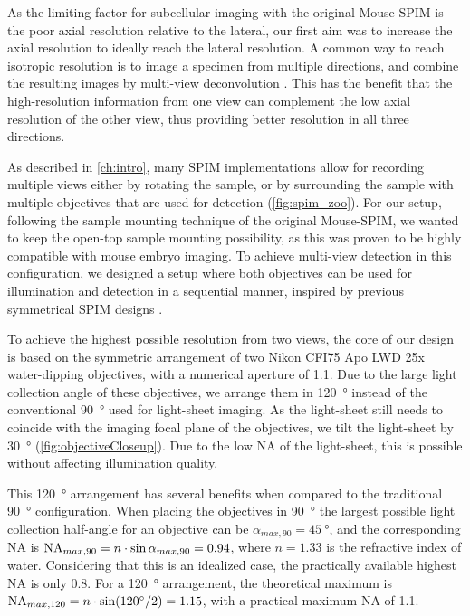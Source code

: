   As the limiting factor for subcellular imaging with the original Mouse-SPIM is the poor axial resolution relative to the lateral, our first aim was to increase the axial resolution to ideally reach the lateral resolution. A common way to reach isotropic resolution is to image a specimen from multiple directions, and combine the resulting images by multi-view deconvolution \cite{swoger_multi-view_2007,temerinac-ott_multiview_2012, preibisch_efficient_2014}. This has the benefit that the high-resolution information from one view can complement the low axial resolution of the other view, thus providing better resolution in all three directions.

  As described in \autoref{ch:intro}, many SPIM implementations allow for recording multiple views either by rotating the sample, or by surrounding the sample with multiple objectives that are used for detection (\autoref{fig:spim_zoo}). For our setup, following the sample mounting technique of the original Mouse-SPIM, we wanted to keep the open-top sample mounting possibility, as this was proven to be highly compatible with mouse embryo imaging. To achieve multi-view detection in this configuration, we designed a setup where both objectives can be used for illumination and detection in a sequential manner, inspired by previous symmetrical SPIM designs \cite{balazs_development_2013, wu_spatially_2013}.

  To achieve the highest possible resolution from two views, the core of our design is based on the symmetric arrangement of two Nikon CFI75 Apo LWD 25x water-dipping objectives, with a numerical aperture of 1.1. Due to the large light collection angle of these objectives, we arrange them in \SI{120}{\degree} instead of the conventional \SI{90}{\degree} used for light-sheet imaging. As the light-sheet still needs to coincide with the imaging focal plane of the objectives, we tilt the light-sheet by \SI{30}{\degree} (\autoref{fig:objectiveCloseup}). Due to the low NA of the light-sheet, this is possible without affecting illumination quality.

  This \SI{120}{\degree} arrangement has several benefits when compared to the traditional \SI{90}{\degree} configuration. When placing the objectives in \SI{90}{\degree} the largest possible light collection half-angle for an objective can be $\alpha_{max,90} =\SI{45}{\degree}$, and the corresponding NA is $\operatorname{NA}_{max,90} = n \cdot \sin \alpha_{max,90} = 0.94$, where $n=1.33$ is the refractive index of water. Considering that this is an idealized case, the practically available highest NA is only 0.8. For a \SI{120}{\degree} arrangement, the theoretical maximum is $\na_{max,120} = n \cdot \sin (\SI{120}{\degree} /2) = 1.15$, with a practical maximum NA of 1.1.

